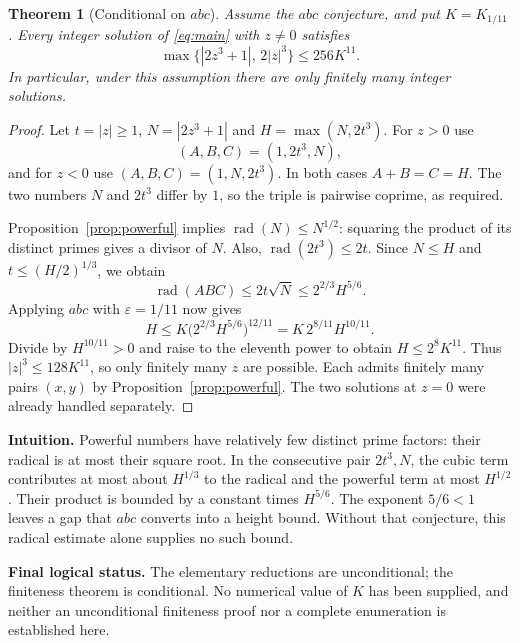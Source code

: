 \documentclass[11pt,a4paper]{article}
\newtheorem{theorem}{Theorem}
\newcommand{\rad}{\operatorname{rad}}
\begin{document}
\begin{theorem}[Conditional on $abc$]\label{thm:abc}
Assume the $abc$ conjecture, and put $K=K_{1/11}$. Every integer solution
of \eqref{eq:main} with $z\ne0$ satisfies
\[
 \max\{|2z^3+1|,\,2|z|^3\}\le256K^{11}.
\]
In particular, under this assumption there are only finitely many integer
solutions.
\end{theorem}
\begin{proof}
Let $t=|z|\ge1$, $N=|2z^3+1|$ and $H=\max(N,2t^3)$. For $z>0$ use
\[
 (A,B,C)=(1,2t^3,N),
\]
and for $z<0$ use $(A,B,C)=(1,N,2t^3)$. In both cases $A+B=C=H$.
The two numbers $N$ and $2t^3$ differ by $1$, so the triple is pairwise
coprime, as required.

Proposition~\ref{prop:powerful} implies $\rad(N)\le N^{1/2}$: squaring
the product of its distinct primes gives a divisor of $N$. Also,
$\rad(2t^3)\le2t$. Since $N\le H$ and $t\le(H/2)^{1/3}$, we obtain
\begin{equation}\label{eq:radbound}
 \rad(ABC)\le2t\sqrt N\le2^{2/3}H^{5/6}.
\end{equation}
Applying $abc$ with $\varepsilon=1/11$ now gives
\[
 H\le K\bigl(2^{2/3}H^{5/6}\bigr)^{12/11}
   =K\,2^{8/11}H^{10/11}.
\]
Divide by $H^{10/11}>0$ and raise to the eleventh power to obtain
$H\le2^8K^{11}$. Thus $|z|^3\le128K^{11}$, so only finitely many $z$
are possible. Each admits finitely many pairs $(x,y)$ by
Proposition~\ref{prop:powerful}. The two solutions at $z=0$ were already
handled separately.
\end{proof}

\textbf{Intuition.} Powerful numbers have relatively few distinct prime
factors: their radical is at most their square root. In the consecutive
pair $2t^3,N$, the cubic term contributes at most about $H^{1/3}$ to the
radical and the powerful term at most $H^{1/2}$. Their product is bounded
by a constant times $H^{5/6}$. The exponent $5/6<1$ leaves a gap that
$abc$ converts into a height bound. Without that conjecture, this radical
estimate alone supplies no such bound.

\textbf{Final logical status.} The elementary reductions are unconditional;
the finiteness theorem is conditional. No numerical value of $K$ has
been supplied, and neither an unconditional finiteness proof nor a
complete enumeration is established here.
\end{document}
